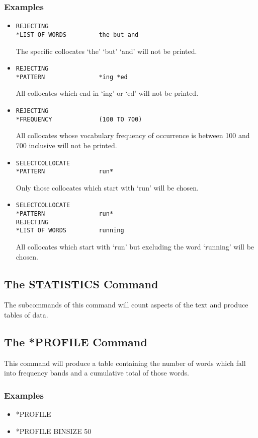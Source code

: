 \subsubsection{Examples}
\begin{itemize}
\item
\begin{verbatim}
REJECTING
*LIST OF WORDS         the but and
\end{verbatim}
The specific collocates `the' `but' `and' will not be printed.

\item
\begin{verbatim}
REJECTING
*PATTERN               *ing *ed
\end{verbatim}
All collocates which end in `ing' or `ed' will not be printed.

\item
\begin{verbatim}
REJECTING
*FREQUENCY             (100 TO 700)
\end{verbatim}
All collocates whose vocabulary frequency of occurrence is
between 100 and 700 inclusive will not be printed.

\item
\begin{verbatim}
SELECTCOLLOCATE
*PATTERN               run*
\end{verbatim}
Only those collocates which start with `run' will be chosen.

\item
\begin{verbatim}
SELECTCOLLOCATE
*PATTERN               run*
REJECTING
*LIST OF WORDS         running
\end{verbatim}
All collocates which start with `run' but excluding the word `running'
will be chosen.
\end{itemize}

\subsection{The STATISTICS Command}
The subcommands of this command will count aspects of the text and produce
tables of data.
\subsection{The *PROFILE Command}
This command will produce a table containing the number of words which fall
into frequency bands and a cumulative total of those words.
\subsubsection{Examples}
\begin{itemize}
\item *PROFILE
\item *PROFILE       BINSIZE 50
\end{itemize}

